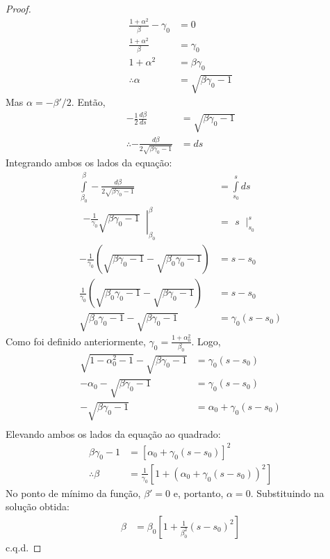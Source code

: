 \begin{proof}
\begin{align*}
		\frac{1+\alpha^2}{\beta} - \gamma_0 &= 0\\
		\frac{1+\alpha^2}{\beta} &= \gamma_0\\
		1+\alpha^2 &= \beta \gamma_0\\
		\therefore \alpha &= \sqrt{\beta\gamma_0 -1}
	\end{align*}
	Mas $\alpha = -\beta'/2$. Então,
	\begin{align*}
		-\frac{1}{2}\frac{d\beta}{ds} &= \sqrt{\beta\gamma_0 -1}\\
		\therefore -\frac{d\beta}{2\sqrt{\beta\gamma_0 -1}} &= ds
	\end{align*}
	Integrando ambos os lados da equação:
	\begin{align*}
		\int\limits_{\beta_0}^{\beta}-\frac{d\beta}{2\sqrt{\beta\gamma_0 -1}} &= \int\limits_{s_0}^{s}ds\\
		\left.\begin{matrix}
		-\frac{1}{\gamma_0}\sqrt{\beta\gamma_0-1}
		\end{matrix}\ \right|^\beta_{\beta_0} &= \left.\begin{matrix}
				s
				\end{matrix}\ \right|^s_{s_0}\\
		-\frac{1}{\gamma_0}\left(\sqrt{\beta\gamma_0-1}-\sqrt{\beta_0\gamma_0-1}\right) &= s-s_0\\
		\frac{1}{\gamma_0}\left(\sqrt{\beta_0\gamma_0-1}-\sqrt{\beta\gamma_0-1}\right) &= s-s_0\\
		\sqrt{\beta_0\gamma_0-1}-\sqrt{\beta\gamma_0-1} &= \gamma_0(s-s_0)
	\end{align*}
	Como foi definido anteriormente, $\gamma_0 = \frac{1+\alpha_0^2}{\beta_0}$. Logo,
	\begin{align*}
		\sqrt{1-\alpha_0^2-1}-\sqrt{\beta\gamma_0-1} &= \gamma_0(s-s_0)\\
		-\alpha_0-\sqrt{\beta\gamma_0-1} &= \gamma_0(s-s_0)\\
		-\sqrt{\beta\gamma_0-1} &= \alpha_0+\gamma_0(s-s_0)\\
	\end{align*}
	Elevando ambos os lados da equação ao quadrado:
	\begin{align*}
		\beta\gamma_0-1 &= [\alpha_0+\gamma_0(s-s_0)]^2\\
		\therefore \beta &= \frac{1}{\gamma_0}[1+(\alpha_0+\gamma_0(s-s_0))^2]
	\end{align*}
	No ponto de mínimo da função, $\beta'=0$ e, portanto, $\alpha=0$. Substituindo na solução obtida:
	\begin{align*}
		\beta &= \beta_0\left[1+\frac{1}{\beta_0^2}(s-s_0)^2\right]
	\end{align*}
	c.q.d.
\end{proof}

